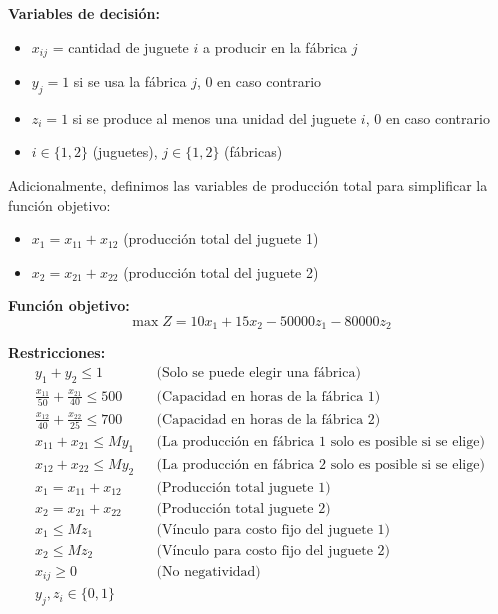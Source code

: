 \documentclass[12pt]{article}
\begin{document}
\textbf{Variables de decisión:}
\begin{itemize}
    \item $x_{ij}$ = cantidad de juguete $i$ a producir en la fábrica $j$
    \item $y_j = 1$ si se usa la fábrica $j$, 0 en caso contrario
    \item $z_i = 1$ si se produce al menos una unidad del juguete $i$, 0 en caso contrario
    \item $i \in \{1, 2\}$ (juguetes), $j \in \{1, 2\}$ (fábricas)
\end{itemize}

Adicionalmente, definimos las variables de producción total para simplificar la función objetivo:
\begin{itemize}
    \item $x_1 = x_{11} + x_{12}$ (producción total del juguete 1)
    \item $x_2 = x_{21} + x_{22}$ (producción total del juguete 2)
\end{itemize}

\textbf{Función objetivo:}
$$\max Z = 10x_1 + 15x_2 - 50000z_1 - 80000z_2$$

\textbf{Restricciones:}
\begin{align*}
    y_1 + y_2 \leq 1 && \text{(Solo se puede elegir una fábrica)} \\
    \frac{x_{11}}{50} + \frac{x_{21}}{40} \leq 500 && \text{(Capacidad en horas de la fábrica 1)} \\
    \frac{x_{12}}{40} + \frac{x_{22}}{25} \leq 700 && \text{(Capacidad en horas de la fábrica 2)} \\
    x_{11} + x_{21} \leq M y_1 && \text{(La producción en fábrica 1 solo es posible si se elige)} \\
    x_{12} + x_{22} \leq M y_2 && \text{(La producción en fábrica 2 solo es posible si se elige)} \\
    x_1 = x_{11} + x_{12} && \text{(Producción total juguete 1)} \\
    x_2 = x_{21} + x_{22} && \text{(Producción total juguete 2)} \\
    x_1 \leq M z_1 && \text{(Vínculo para costo fijo del juguete 1)} \\
    x_2 \leq M z_2 && \text{(Vínculo para costo fijo del juguete 2)} \\
    x_{ij} \geq 0 && \text{(No negatividad)} \\
    y_j, z_i \in \{0,1\} &&
\end{align*}
\end{document}

